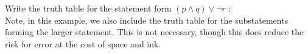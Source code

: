 \guard







\begin{exmp}
\label{exmp:notOrAndTruthTable3}
  Write the truth table for the statement form $(p\wedge q) \vee \neg r$ :\\
  Note, in this example, we also include the truth table for the substatements forming the larger statement.
  This is not necessary, though this does reduce the risk for error at the cost of space and ink.
  \begin{center}
    
  \end{center}
\end{exmp}
